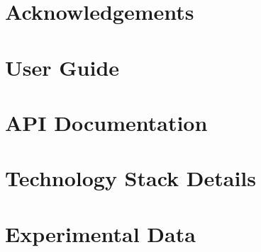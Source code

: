 \documentclass[15pt,a4paper]{book}
\begin{document}
\frontmatter
{}




\chapter*{Acknowledgements}


\tableofcontents

\mainmatter
{}









\appendix
\chapter{User Guide}
\label{appendix:user-guide}


\chapter{API Documentation}
\label{appendix:api-documentation}


\chapter{Technology Stack Details}
\label{appendix:technology-stack}


\chapter{Experimental Data}
\label{appendix:experimental-data}





\end{document}
